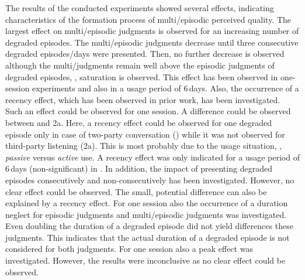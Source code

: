 The results of the conducted experiments showed several effects, indicating characteristics of the formation process of multi\-/episodic perceived quality.
The largest effect on multi\-/episodic judgments is observed for an increasing number of degraded episodes.
The multi\-/episodic judgments decrease until three consecutive degraded episodes/days were presented.
Then, no further decrease is observed although the multi\-/judgments remain well above the episodic judgments of degraded episodes, \ie, saturation is observed.
This effect has been observed in one-session experiments and also in a usage period of 6\,days.
Also, the occurrence of a recency effect, which has been observed in prior work, has been investigated.
Such an effect could be observed for one session.
A difference could be observed between  and \E2a{}.
Here, a recency effect could be observed for one degraded episode only in case of two-party conversation () while it was not observed for third-party listening (\E2a{}).
This is most probably due to the usage situation, \ie, \emph{passive} versus \emph{active} use.
A recency effect was only indicated for a usage period of 6\,days (non-significant) in .
In addition, the impact of presenting degraded episodes consecutively and non-consecutively has been investigated.
However, no clear effect could be observed.
The small, potential difference can also be explained by a recency effect.
For one session also the occurrence of a duration neglect for episodic judgments and multi\-/episodic judgments was investigated.
Even doubling the duration of a degraded episode did not yield differences these judgments.
This indicates that the actual duration of a degraded episode is not considered for both judgments.
For one session also a peak effect was investigated.
However, the results were inconclusive as no clear effect could be observed.

